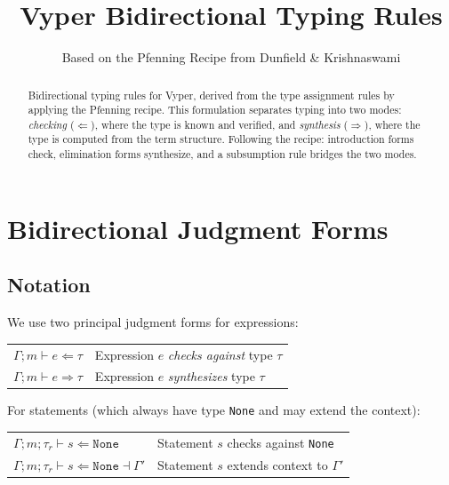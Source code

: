 \documentclass[11pt]{article}
\title{Vyper Bidirectional Typing Rules}
\author{Based on the Pfenning Recipe from Dunfield \& Krishnaswami}
\date{}
\newcommand{\kw}[1]{\texttt{#1}}
\newcommand{\checks}{\Leftarrow}
\newcommand{\synth}{\Rightarrow}
\begin{document}
\maketitle

\begin{abstract}
Bidirectional typing rules for Vyper, derived from the type assignment rules
by applying the Pfenning recipe. This formulation separates typing into two
modes: \emph{checking} ($\checks$), where the type is known and verified, and
\emph{synthesis} ($\synth$), where the type is computed from the term structure.
Following the recipe: introduction forms check, elimination forms synthesize,
and a subsumption rule bridges the two modes.
\end{abstract}

\tableofcontents
\newpage

\section{Bidirectional Judgment Forms}

\subsection{Notation}

We use two principal judgment forms for expressions:

\begin{center}
\begin{tabular}{ll}
$\Gamma; m \vdash e \checks \tau$ & Expression $e$ \emph{checks against} type $\tau$ \\
$\Gamma; m \vdash e \synth \tau$ & Expression $e$ \emph{synthesizes} type $\tau$ \\
\end{tabular}
\end{center}

For statements (which always have type \kw{None} and may extend the context):

\begin{center}
\begin{tabular}{ll}
$\Gamma; m; \tau_r \vdash s \checks \kw{None}$ & Statement $s$ checks against \kw{None} \\
$\Gamma; m; \tau_r \vdash s \checks \kw{None} \dashv \Gamma'$ & Statement $s$ extends context to $\Gamma'$ \\
\end{tabular}
\end{center}
\end{document}
